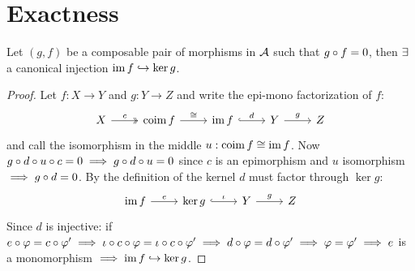 \documentclass[a4paper]{report}
\begin{document}
\section{Exactness}
\begin{lemm}
  Let $(g,f)$ be a composable pair of morphisms in $\mathcal{A}$ such that $g \circ f = 0$, then $\exists$ a canonical injection $\operatorname{im} f \hookrightarrow \ker g$.
\end{lemm}
\begin{proof}
  Let $f: X \to Y$ and $g: Y \to Z$ and write the epi-mono factorization of $f$:
  \[\begin{tikzcd}
X \arrow[r, "c", two heads] & \coim f \arrow[r, "\cong"] & \im f \arrow[r, "d", hook] & Y \arrow[r, "g"] & Z
\end{tikzcd}\]and call the isomorphism in the middle $u: \operatorname{coim} f \cong \operatorname{im} f$.
Now $g \circ d \circ u \circ c = 0 \implies g \circ d \circ u = 0$ since $c$ is an epimorphism and $u$ isomorphism $\implies g \circ d = 0$. By the definition of the kernel $d$ must factor through $\ker g$:
\[\begin{tikzcd}
\im f \arrow[r, "e"] & \ker g \arrow[r, "\iota", hook] & Y \arrow[r, "g"] & Z
\end{tikzcd}\]
Since $d$ is injective: if $e \circ \varphi = c \circ \varphi ' \implies \iota \circ c \circ \varphi = \iota \circ c \circ \varphi' \implies d \circ \varphi = d \circ \varphi' \implies \varphi = \varphi ' \implies e$ is a monomorphism $\implies \operatorname{im} f \hookrightarrow \ker g$.
\end{proof}
\end{document}
